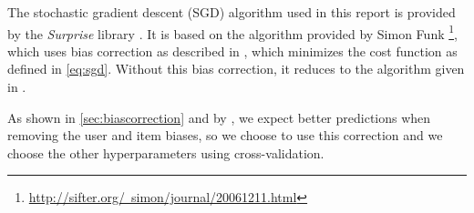 The stochastic gradient descent (SGD) algorithm used in this report is provided by the
\textit{Surprise} library \cite{surprise}.
It is based on the algorithm provided by 
Simon Funk \footnote{\href{}{http://sifter.org/~simon/journal/20061211.html}}, 
which uses bias correction as described in \cite{Koren2009}, which minimizes the
cost function as defined in \eqref{eq:sgd}.
Without this bias correction, it reduces to the algorithm given in \cite{Salak2008}. 

As shown in \ref{sec:biascorrection} and by \cite{Aberger2009}, we expect better predictions when removing
the user and item biases, so we choose to use this correction and we choose the
other hyperparameters using cross-validation. 
